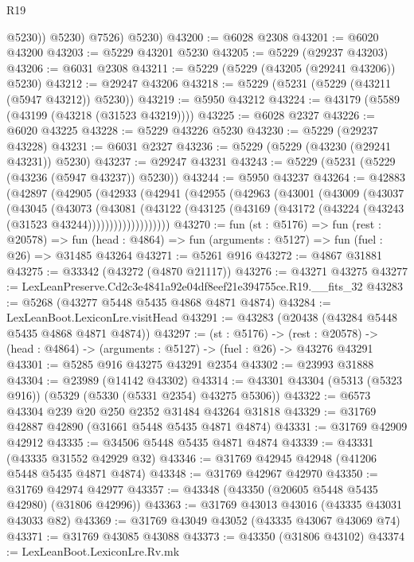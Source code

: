 \begin{lexlean}{R19}
\begin{coremodule}
              @5230))
          @5230)
        @7526)
      @5230)
@43200 := @6028 @2308
@43201 := @6020 @43200
@43203 := @5229 @43201 @5230
@43205 := @5229 (@29237 @43203)
@43206 := @6031 @2308
@43211 := @5229 (@5229 (@43205 (@29241 @43206)) @5230)
@43212 := @29247 @43206
@43218 := @5229 (@5231 (@5229 (@43211 (@5947 @43212)) @5230))
@43219 := @5950 @43212
@43224 := @43179 (@5589 (@43199 (@43218 (@31523 @43219))))
@43225 := @6028 @2327
@43226 := @6020 @43225
@43228 := @5229 @43226 @5230
@43230 := @5229 (@29237 @43228)
@43231 := @6031 @2327
@43236 := @5229 (@5229 (@43230 (@29241 @43231)) @5230)
@43237 := @29247 @43231
@43243 := @5229 (@5231 (@5229 (@43236 (@5947 @43237)) @5230))
@43244 := @5950 @43237
@43264 := @42883
    (@42897
      (@42905
        (@42933
          (@42941
            (@42955
              (@42963
                (@43001
                  (@43009
                    (@43037
                      (@43045
                        (@43073
                          (@43081
                            (@43122
                              (@43125
                                (@43169 (@43172 (@43224 (@43243 (@31523 @43244)))))))))))))))))))
@43270 := fun (st : @5176) =>
  fun (rest : @20578) =>
  fun (head : @4864) => fun (arguments : @5127) => fun (fuel : @26) => @31485 @43264
@43271 := @5261 @916
@43272 := @4867 @31881
@43275 := @33342 (@43272 (@4870 @21117))
@43276 := @43271 @43275
@43277 := LexLeanPreserve.Cd2c3e4841a92e04df8eef21e394755ce.R19.__fits_32
@43283 := @5268 (@43277 @5448 @5435 @4868 @4871 @4874)
@43284 := LexLeanBoot.LexiconLre.visitHead
@43291 := @43283 (@20438 (@43284 @5448 @5435 @4868 @4871 @4874))
@43297 := (st : @5176) ->
  (rest : @20578) -> (head : @4864) -> (arguments : @5127) -> (fuel : @26) -> @43276 @43291
@43301 := @5285 @916 @43275 @43291 @2354
@43302 := @23993 @31888
@43304 := @23989 (@14142 @43302)
@43314 := @43301 @43304 (@5313 (@5323 @916)) (@5329 (@5330 (@5331 @2354) @43275 @5306))
@43322 := @6573 @43304 @239 @20 @250 @2352 @31484 @43264 @31818
@43329 := @31769 @42887 @42890 (@31661 @5448 @5435 @4871 @4874)
@43331 := @31769 @42909 @42912
@43335 := @34506 @5448 @5435 @4871 @4874
@43339 := @43331 (@43335 @31552 @42929 @32)
@43346 := @31769 @42945 @42948 (@41206 @5448 @5435 @4871 @4874)
@43348 := @31769 @42967 @42970
@43350 := @31769 @42974 @42977
@43357 := @43348 (@43350 (@20605 @5448 @5435 @42980) (@31806 @42996))
@43363 := @31769 @43013 @43016 (@43335 @43031 @43033 @82)
@43369 := @31769 @43049 @43052 (@43335 @43067 @43069 @74)
@43371 := @31769 @43085 @43088
@43373 := @43350 (@31806 @43102)
@43374 := LexLeanBoot.LexiconLre.Rv.mk

\end{coremodule}
\end{lexlean}
